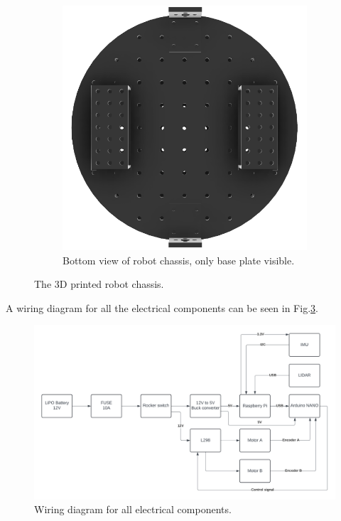 \begin{figure}
\begin{subfigure}[t]{0.49\columnwidth}
		\includegraphics[width=\textwidth]{images/model_bot.png}
		\caption{Bottom view of robot chassis, only base plate visible.}
        \label{fig:bottom_chassis}
	\end{subfigure}
	\caption{The 3D printed robot chassis.}
    \label{fig:robot_chassis}
\end{figure}
A wiring diagram for all the electrical components can be seen in Fig.\:\ref{fig:wiringD}.
\begin{figure}
    \centering
    \includegraphics[width=\columnwidth]{images/wiringD.png}
    \caption{Wiring diagram for all electrical components.}
    \label{fig:wiringD}
\end{figure}
